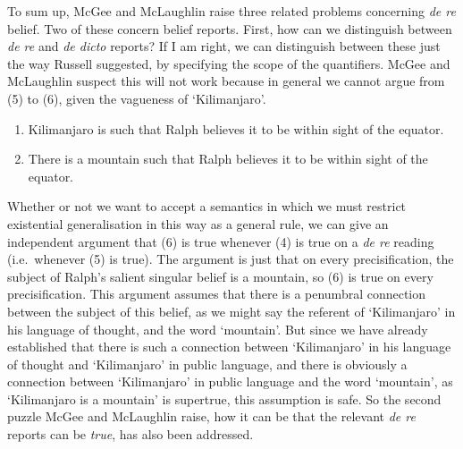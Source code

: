\documentclass[
  11pt,
  letterpaper,
  DIV=11,
  numbers=noendperiod,
  oneside]{scrartcl}
\begin{document}
To sum up, McGee and McLaughlin raise three related problems concerning
\emph{de re} belief. Two of these concern belief reports. First, how can
we distinguish between \emph{de re} and \emph{de dicto} reports? If I am
right, we can distinguish between these just the way Russell suggested,
by specifying the scope of the quantifiers. McGee and McLaughlin suspect
this will not work because in general we cannot argue from (5) to (6),
given the vagueness of `Kilimanjaro'.

\begin{enumerate}
\def\labelenumi{\arabic{enumi}.}
\item
  Kilimanjaro is such that Ralph believes it to be within sight of the
  equator.
\item
  There is a mountain such that Ralph believes it to be within sight of
  the equator.
\end{enumerate}

Whether or not we want to accept a semantics in which we must restrict
existential generalisation in this way as a general rule, we can give an
independent argument that (6) is true whenever (4) is true on a \emph{de
re} reading (i.e.~whenever (5) is true). The argument is just that on
every precisification, the subject of Ralph's salient singular belief is
a mountain, so (6) is true on every precisification. This argument
assumes that there is a penumbral connection between the subject of this
belief, as we might say the referent of `Kilimanjaro' in his language of
thought, and the word `mountain'. But since we have
already established that there is such a connection between
`Kilimanjaro' in his language of thought and `Kilimanjaro' in public
language, and there is obviously a connection between `Kilimanjaro' in
public language and the word `mountain', as `Kilimanjaro is a mountain'
is supertrue, this assumption is safe. So the second puzzle McGee and
McLaughlin raise, how it can be that the relevant \emph{de re} reports
can be \emph{true}, has also been addressed.
\end{document}
